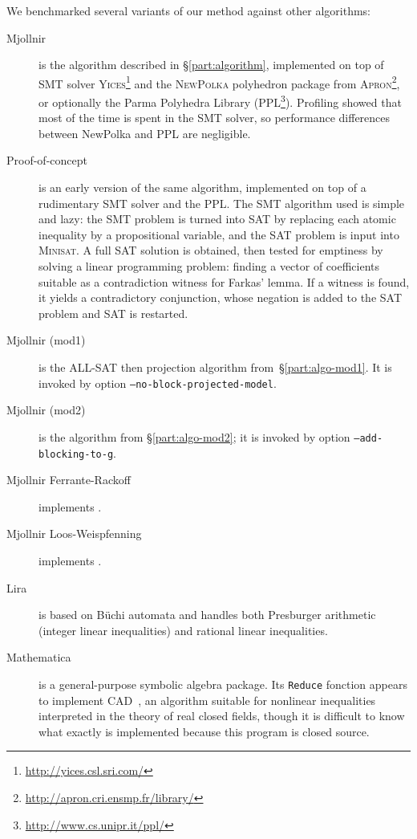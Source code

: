 We benchmarked several variants of our method against other algorithms:
\begin{description}
\item[Mjollnir] is the algorithm described in \S\ref{part:algorithm}, implemented on top of SMT solver \textsc{Yices}\footnote{\url{http://yices.csl.sri.com/}} and the \textsc{NewPolka} polyhedron package from \textsc{Apron}\footnote{\url{http://apron.cri.ensmp.fr/library/}}, or optionally the Parma Polyhedra Library (PPL\footnote{\url{http://www.cs.unipr.it/ppl/}}). Profiling showed that most of the time is spent in the SMT solver, so performance differences between NewPolka and PPL are negligible.

\item[Proof-of-concept] is an early version of the same algorithm, implemented on top of a rudimentary SMT solver and the PPL. The SMT algorithm used is simple and lazy: the SMT problem is turned into SAT by replacing each atomic inequality by a propositional variable, and the SAT problem is input into \textsc{Minisat}. A full SAT solution is obtained, then tested for emptiness by solving a linear programming problem: finding a vector of coefficients suitable as a contradiction witness for Farkas' lemma. If a witness is found, it yields a contradictory conjunction, whose negation is added to the SAT problem and SAT is restarted.

\item[Mjollnir (mod1)] is the ALL-SAT then projection algorithm from~\S\ref{part:algo-mod1}. It is invoked by option \texttt{--no-block-projected-model}.

\item[Mjollnir (mod2)] is the algorithm from \S\ref{part:algo-mod2}; it is invoked by option \texttt{--add-blocking-to-g}.

\item[Mjollnir Ferrante-Rackoff] implements \cite{FerranteRackoff75}\cite[\S 7.3]{BradleyManna07}.

\item[Mjollnir Loos-Weispfenning] implements \cite{LoosWeispfenning93}.

\item[Lira\footnotemark] is based on B\"uchi automata and handles both Presburger arithmetic (integer linear inequalities) and rational linear inequalities.

\item[Mathematica\footnotemark] is a general-purpose symbolic algebra package. Its \texttt{Reduce} fonction appears to implement CAD~\cite{CAD_1998}, an algorithm suitable for nonlinear inequalities interpreted in the theory of real closed fields, though it is difficult to know what exactly is implemented because this program is closed source.


\end{description}
